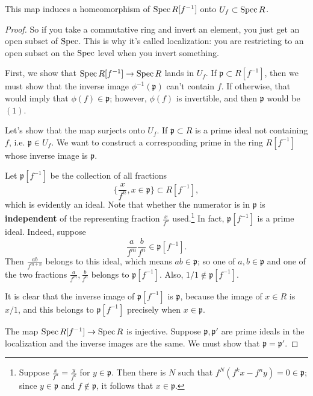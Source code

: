 \begin{proposition} 
This map induces a homeomorphism of $\operatorname{Spec} R[f^{-1}]$ onto $U_f
\subset \operatorname{Spec}
R$. 
\end{proposition} 
\begin{proof}
So if you take a commutative ring and invert an element, you
just get an open
subset of $\operatorname{Spec}$. This is why it's called localization: you are
restricting to
an open subset on the $\operatorname{Spec} $ level when you invert something.

First, we show that $\operatorname{Spec} R[f^{-1}] \to \operatorname{Spec} R$ lands in
$U_f$. If
$\mathfrak{p} \subset R[f^{-1}]$, then we must show that the
inverse image
$\phi^{-1}(\mathfrak{p})$ can't contain $f$. If otherwise, that
would imply that
$\phi(f) \in \mathfrak{p}$; however, $\phi(f)$ is invertible,
and then
$\mathfrak{p}$ would be $(1)$.  
\item Let's show that the map surjects onto $U_f$. If
$\mathfrak{p} \subset R$ is a prime
ideal not containing $f$, i.e. $\mathfrak{p} \in U_f$. We want
to construct a
corresponding prime in the ring $R[f^{-1}]$ whose inverse image
is $\mathfrak{p}$.

Let $\mathfrak{p}[f^{-1}]$ be the collection of all fractions
\[ \{\frac{x}{f^n}, x \in \mathfrak{p}\} \subset R[f^{-1}],  \]
which is evidently an ideal. Note that whether the numerator is
in
$\mathfrak{p}$ is \textbf{independent} of the
representing fraction $\frac{x}{f^n}$ used.\footnote{Suppose
$\frac{x}{f^n} =
\frac{y}{f^k}$ for $y \in \mathfrak{p}$. Then there is $N$ such
that
$f^N(f^k x - f^n y) = 0 \in \mathfrak{p}$; since $y \in
\mathfrak{p}$ and $f
\notin \mathfrak{p}$, it follows that $x \in \mathfrak{p}$.}
In fact, $\mathfrak{p}[f^{-1}]$ is a prime ideal. Indeed,
suppose
\[  \frac{a}{f^m} \frac{b}{f^n} \in \mathfrak{p}[f^{-1}] .\]
Then $\frac{ab}{f^{m+n}}$ belongs to this ideal, which means $ab
\in
\mathfrak{p}$; so one of $a,b \in \mathfrak{p}$ and one of the
two fractions
$\frac{a}{f^m}, \frac{b}{f^n}$ belongs to
$\mathfrak{p}[f^{-1}]$. Also, $1/1
\notin \mathfrak{p}[f^{-1}]$.

It is clear that the inverse image of $\mathfrak{p}[f^{-1}]$ is
$\mathfrak{p}$,
because the image of $x \in R$ is $x/1$, and this belongs to
$\mathfrak{p}[f^{-1}]$ precisely when $x \in \mathfrak{p}$.
\item The map $\operatorname{Spec} R[f^{-1}] \to \operatorname{Spec} R$ is injective.
Suppose
$\mathfrak{p}, \mathfrak{p'}$ are prime ideals in the
localization and the
inverse images are the same.  
We must show that $\mathfrak{p} = \mathfrak{p'}$.


\end{proof}
